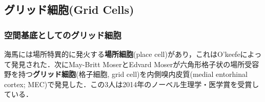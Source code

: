 \subsection{グリッド細胞(Grid Cells)}\subsubsection{空間基底としてのグリッド細胞}海馬には場所特異的に発火する\textbf{場所細胞}(place cell)があり，これはO'keefeによって発見された．次にMay-Britt MoserとEdvard Moserが六角形格子状の場所受容野を持つ\textbf{グリッド細胞}(格子細胞, grid cell)を内側嗅内皮質(medial entorhinal cortex; MEC)で発見した．この3人は2014年のノーベル生理学・医学賞を受賞している．